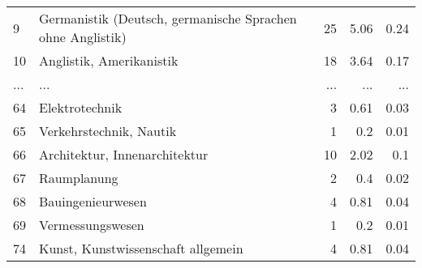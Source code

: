 \begin{longtable}{lXrrr}
        9 & \multicolumn{1}{X}{Germanistik (Deutsch, germanische Sprachen ohne Anglistik)} & %
          \num{25} &
          \num[round-mode=places,round-precision=2]{5,06} &
          \num[round-mode=places,round-precision=2]{0,24} \\
        10 & \multicolumn{1}{X}{Anglistik, Amerikanistik} & %
          \num{18} &
          \num[round-mode=places,round-precision=2]{3,64} &
          \num[round-mode=places,round-precision=2]{0,17} \\
       ... & ... & ... & ... & ... \\
        64 & \multicolumn{1}{X}{Elektrotechnik} & %
          \num{3} &
          \num[round-mode=places,round-precision=2]{0,61} &
          \num[round-mode=places,round-precision=2]{0,03} \\

        65 & \multicolumn{1}{X}{Verkehrstechnik, Nautik} & %
          \num{1} &
          \num[round-mode=places,round-precision=2]{0,2} &
          \num[round-mode=places,round-precision=2]{0,01} \\

        66 & \multicolumn{1}{X}{Architektur, Innenarchitektur} & %
          \num{10} &
          \num[round-mode=places,round-precision=2]{2,02} &
          \num[round-mode=places,round-precision=2]{0,1} \\

        67 & \multicolumn{1}{X}{Raumplanung} & %
          \num{2} &
          \num[round-mode=places,round-precision=2]{0,4} &
          \num[round-mode=places,round-precision=2]{0,02} \\

        68 & \multicolumn{1}{X}{Bauingenieurwesen} & %
          \num{4} &
          \num[round-mode=places,round-precision=2]{0,81} &
          \num[round-mode=places,round-precision=2]{0,04} \\

        69 & \multicolumn{1}{X}{Vermessungswesen} & %
          \num{1} &
          \num[round-mode=places,round-precision=2]{0,2} &
          \num[round-mode=places,round-precision=2]{0,01} \\

        74 & \multicolumn{1}{X}{Kunst, Kunstwissenschaft allgemein} & %
          \num{4} &
          \num[round-mode=places,round-precision=2]{0,81} &
          \num[round-mode=places,round-precision=2]{0,04} \\


\end{longtable}
